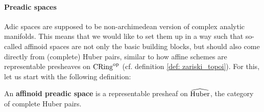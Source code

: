                 \paragraph{Preadic spaces}
                    Adic spaces are supposed to be non-archimedean version of complex analytic manifolds. This means that we would like to set them up in a way such that so-called affinoid spaces are not only the basic building blocks, but should also come directly from (complete) Huber pairs, similar to how affine schemes are representable presheaves on $\mathrm{CRing}^{\mathrm{op}}$ (cf. definition \ref{def: zariski_topoi}). For this, let us start with the following definition:
                    \begin{definition} \label{def: pre_adic_spaces}
                        An \textbf{affinoid preadic space} is a representable presheaf on $\widehat{\mathrm{Huber}}$, the category of complete Huber pairs. 
                    \end{definition}
                    
